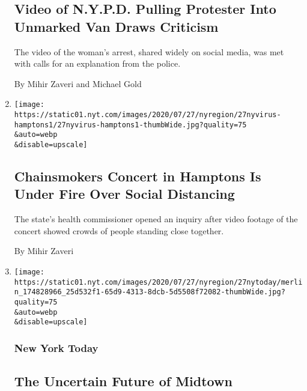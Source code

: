 \begin{enumerate}
{  \subsection{Video of N.Y.P.D. Pulling Protester Into Unmarked Van
  Draws
  Criticism}\label{video-of-nypd-pulling-protester-into-unmarked-van-draws-criticism}}

  The video of the woman's arrest, shared widely on social media, was
  met with calls for an explanation from the police.

  By Mihir Zaveri and Michael Gold
\item
  \href{/2020/07/27/nyregion/hamptons-chainsmokers-concert-social-distancing.html}{}

  \texttt{[image: https://static01.nyt.com/images/2020/07/27/nyregion/27nyvirus-hamptons1/27nyvirus-hamptons1-thumbWide.jpg?quality=75\\\&auto=webp\\\&disable=upscale]}

  \hypertarget{chainsmokers-concert-in-hamptons-is-under-fire-over-social-distancing}{%
  \subsection{Chainsmokers Concert in Hamptons Is Under Fire Over Social
  Distancing}\label{chainsmokers-concert-in-hamptons-is-under-fire-over-social-distancing}}

  The state's health commissioner opened an inquiry after video footage
  of the concert showed crowds of people standing close together.

  By Mihir Zaveri
\item
  \href{/2020/07/27/nyregion/nyc-midtown-manhattan-coronavirus.html}{}

  \texttt{[image: https://static01.nyt.com/images/2020/07/27/nyregion/27nytoday/merlin\_174828966\_25d532f1-65d9-4313-8dcb-5d5508f72082-thumbWide.jpg?quality=75\\\&auto=webp\\\&disable=upscale]}

  \hypertarget{new-york-today}{%
  \subsubsection{New York Today}\label{new-york-today}}

  \hypertarget{the-uncertain-future-of-midtown}{%
  \subsection{The Uncertain Future of
  Midtown}\label{the-uncertain-future-of-midtown}}


\end{enumerate}
